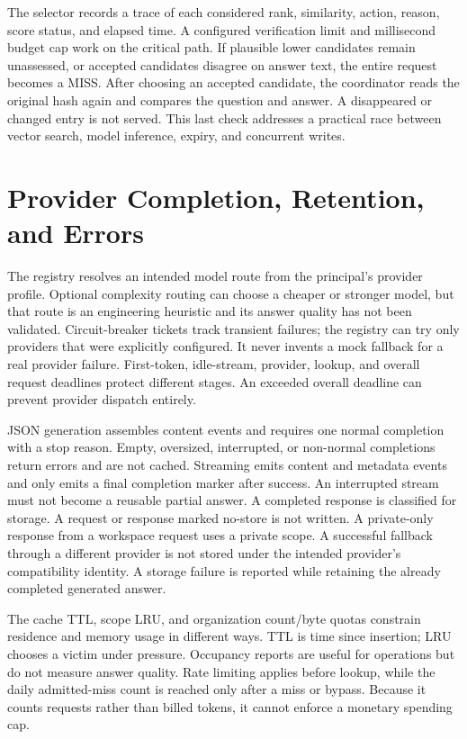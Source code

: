 The selector records a trace of each considered rank, similarity, action, reason, score status, and elapsed time. A configured verification limit and millisecond budget cap work on the critical path. If plausible lower candidates remain unassessed, or accepted candidates disagree on answer text, the entire request becomes a MISS. After choosing an accepted candidate, the coordinator reads the original hash again and compares the question and answer. A disappeared or changed entry is not served. This last check addresses a practical race between vector search, model inference, expiry, and concurrent writes.

\section{Provider Completion, Retention, and Errors}
The registry resolves an intended model route from the principal's provider profile. Optional complexity routing can choose a cheaper or stronger model, but that route is an engineering heuristic and its answer quality has not been validated. Circuit-breaker tickets track transient failures; the registry can try only providers that were explicitly configured. It never invents a mock fallback for a real provider failure. First-token, idle-stream, provider, lookup, and overall request deadlines protect different stages. An exceeded overall deadline can prevent provider dispatch entirely.

JSON generation assembles content events and requires one normal completion with a stop reason. Empty, oversized, interrupted, or non-normal completions return errors and are not cached. Streaming emits content and metadata events and only emits a final completion marker after success. An interrupted stream must not become a reusable partial answer. A completed response is classified for storage. A request or response marked no-store is not written. A private-only response from a workspace request uses a private scope. A successful fallback through a different provider is not stored under the intended provider's compatibility identity. A storage failure is reported while retaining the already completed generated answer.

The cache TTL, scope LRU, and organization count/byte quotas constrain residence and memory usage in different ways. TTL is time since insertion; LRU chooses a victim under pressure. Occupancy reports are useful for operations but do not measure answer quality. Rate limiting applies before lookup, while the daily admitted-miss count is reached only after a miss or bypass. Because it counts requests rather than billed tokens, it cannot enforce a monetary spending cap.

